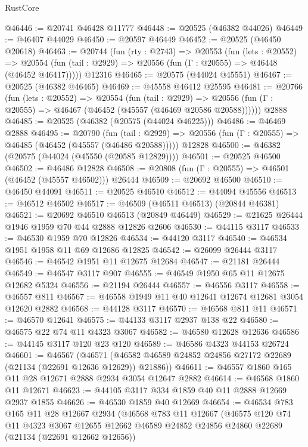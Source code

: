 \begin{lexlean}{RustCore}
\begin{coremodule}
@46446 := @20741 @46428 @11777
@46448 := @20525 (@46382 @44026)
@46449 := @46407 @44029
@46450 := @20597 @46449
@46452 := @20525 (@46450 @20618)
@46463 := @20744
    (fun (rty : @2743) =>
    @20553
      (fun (lets : @20552) =>
      @20554 (fun (tail : @2929) => @20556 (fun (Γ : @20555) => @46448 (@46452 @46417)))))
    @12316
@46465 := @20575 (@44024 @45551)
@46467 := @20525 (@46382 @46465)
@46469 := @45558 @46412 @25595
@46481 := @20766
    (fun (lets : @20552) =>
    @20554
      (fun (tail : @2929) =>
      @20556 (fun (Γ : @20555) => @46467 (@46452 (@45557 (@46469 @20586 @20588))))))
    @2888
@46485 := @20525 (@46382 (@20575 (@44024 @46225)))
@46486 := @46469 @2888
@46495 := @20790
    (fun (tail : @2929) => @20556 (fun (Γ : @20555) => @46485 (@46452 (@45557 (@46486 @20588)))))
    @12828
@46500 := @46382 (@20575 (@44024 (@45550 (@20585 @12829))))
@46501 := @20525 @46500
@46502 := @46486 @12828
@46508 := @20808 (fun (Γ : @20555) => @46501 (@46452 (@45557 @46502))) @26444
@46509 := @20692 @46500
@46510 := @46450 @44091
@46511 := @20525 @46510
@46512 := @44094 @45556
@46513 := @46512 @46502
@46517 := @46509 (@46511 @46513) (@20844 @46381)
@46521 := @20692 @46510 @46513 (@20849 @46449)
@46529 := @21625 @26444 @1946 @1959 @70 @44 @2888 @12826 @2606
@46530 := @44115 @3117
@46533 := @46530 @1959 @70 @12826
@46534 := @44120 @3117
@46540 := @46534 @1951 @1958 @11 @69 @12686 @12825
@46542 := @26099 @26444 @3117
@46546 := @46542 @1951 @11 @12675 @12684
@46547 := @21181 @26444
@46549 := @46547 @3117 @907
@46555 := @46549 @1950 @65 @11 @12675 @12682 @5324
@46556 := @21194 @26444
@46557 := @46556 @3117
@46558 := @46557 @811
@46567 := @46558 @1949 @11 @40 @12641 @12674 @12681 @3054 @12620 @2882
@46568 := @44128 @3117
@46570 := @46568 @811 @11
@46571 := @46570 @12641
@46575 := @44133 @3117 @2937 @138 @22
@46580 := @46575 @22 @74 @11 @4323 @3067
@46582 := @46580 @12628 @12636
@46586 := @44145 @3117 @120 @23 @120
@46589 := @46586 @4323 @44153 @26724
@46601 := @46567
    (@46571 (@46582 @46589 @24852 @24856 @27172 @22689 (@21134 (@22691 @12636 @12629)) @21886))
@46611 := @46557 @1860 @165 @11 @28 @12671 @2888 @2934 @3054 @12647 @2882
@46614 := @46568 @1860 @11 @12671
@46623 := @44105 @3117 @334 @1859 @40 @11 @2888 @12669 @2937 @1855
@46626 := @46530 @1859 @40 @12669
@46654 := @46534
    @783
    @165
    @11
    @28
    @12667
    @2934
    (@46568
      @783
      @11
      @12667
      (@46575
        @120
        @74
        @11
        @4323
        @3067
        @12655
        @12662
        @46589
        @24852
        @24856
        @24860
        @22689
        (@21134 (@22691 @12662 @12656))

\end{coremodule}
\end{lexlean}
